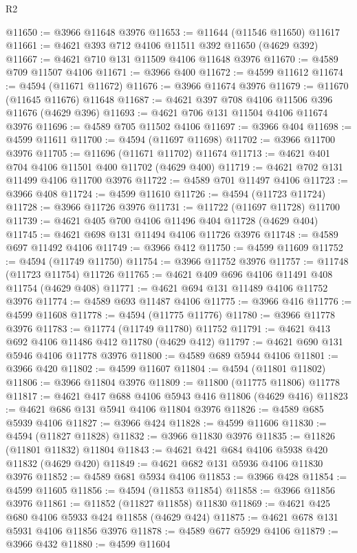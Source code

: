 \begin{lexlean}{R2}
\begin{coremodule}
@11650 := @3966 @11648 @3976
@11653 := @11644 (@11546 @11650) @11617
@11661 := @4621 @393 @712 @4106 @11511 @392 @11650 (@4629 @392)
@11667 := @4621 @710 @131 @11509 @4106 @11648 @3976
@11670 := @4589 @709 @11507 @4106
@11671 := @3966 @400
@11672 := @4599 @11612
@11674 := @4594 (@11671 @11672)
@11676 := @3966 @11674 @3976
@11679 := @11670 (@11645 @11676) @11648
@11687 := @4621 @397 @708 @4106 @11506 @396 @11676 (@4629 @396)
@11693 := @4621 @706 @131 @11504 @4106 @11674 @3976
@11696 := @4589 @705 @11502 @4106
@11697 := @3966 @404
@11698 := @4599 @11611
@11700 := @4594 (@11697 @11698)
@11702 := @3966 @11700 @3976
@11705 := @11696 (@11671 @11702) @11674
@11713 := @4621 @401 @704 @4106 @11501 @400 @11702 (@4629 @400)
@11719 := @4621 @702 @131 @11499 @4106 @11700 @3976
@11722 := @4589 @701 @11497 @4106
@11723 := @3966 @408
@11724 := @4599 @11610
@11726 := @4594 (@11723 @11724)
@11728 := @3966 @11726 @3976
@11731 := @11722 (@11697 @11728) @11700
@11739 := @4621 @405 @700 @4106 @11496 @404 @11728 (@4629 @404)
@11745 := @4621 @698 @131 @11494 @4106 @11726 @3976
@11748 := @4589 @697 @11492 @4106
@11749 := @3966 @412
@11750 := @4599 @11609
@11752 := @4594 (@11749 @11750)
@11754 := @3966 @11752 @3976
@11757 := @11748 (@11723 @11754) @11726
@11765 := @4621 @409 @696 @4106 @11491 @408 @11754 (@4629 @408)
@11771 := @4621 @694 @131 @11489 @4106 @11752 @3976
@11774 := @4589 @693 @11487 @4106
@11775 := @3966 @416
@11776 := @4599 @11608
@11778 := @4594 (@11775 @11776)
@11780 := @3966 @11778 @3976
@11783 := @11774 (@11749 @11780) @11752
@11791 := @4621 @413 @692 @4106 @11486 @412 @11780 (@4629 @412)
@11797 := @4621 @690 @131 @5946 @4106 @11778 @3976
@11800 := @4589 @689 @5944 @4106
@11801 := @3966 @420
@11802 := @4599 @11607
@11804 := @4594 (@11801 @11802)
@11806 := @3966 @11804 @3976
@11809 := @11800 (@11775 @11806) @11778
@11817 := @4621 @417 @688 @4106 @5943 @416 @11806 (@4629 @416)
@11823 := @4621 @686 @131 @5941 @4106 @11804 @3976
@11826 := @4589 @685 @5939 @4106
@11827 := @3966 @424
@11828 := @4599 @11606
@11830 := @4594 (@11827 @11828)
@11832 := @3966 @11830 @3976
@11835 := @11826 (@11801 @11832) @11804
@11843 := @4621 @421 @684 @4106 @5938 @420 @11832 (@4629 @420)
@11849 := @4621 @682 @131 @5936 @4106 @11830 @3976
@11852 := @4589 @681 @5934 @4106
@11853 := @3966 @428
@11854 := @4599 @11605
@11856 := @4594 (@11853 @11854)
@11858 := @3966 @11856 @3976
@11861 := @11852 (@11827 @11858) @11830
@11869 := @4621 @425 @680 @4106 @5933 @424 @11858 (@4629 @424)
@11875 := @4621 @678 @131 @5931 @4106 @11856 @3976
@11878 := @4589 @677 @5929 @4106
@11879 := @3966 @432
@11880 := @4599 @11604

\end{coremodule}
\end{lexlean}
